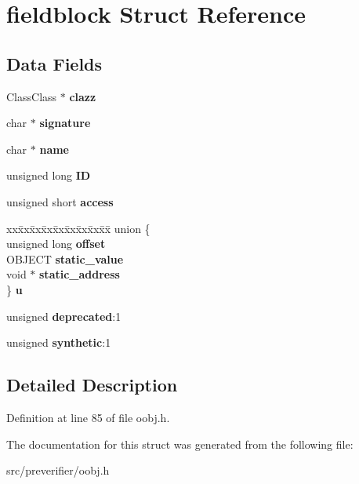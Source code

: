 \section{fieldblock Struct Reference}
\label{structfieldblock}
\subsection*{Data Fields}
\begin{DoxyCompactItemize}
\item 
ClassClass $\ast$ {\bfseries clazz}\label{structfieldblock_a1c9b6020cc197847c281e94df07b95b5}

\item 
char $\ast$ {\bfseries signature}\label{structfieldblock_a56524c11d5419653568ecfe54da096c4}

\item 
char $\ast$ {\bfseries name}\label{structfieldblock_a1116b87afcd1f49d7b7492f71d623825}

\item 
unsigned long {\bfseries ID}\label{structfieldblock_a4592680e5676103947a5ccf3e38e2795}

\item 
unsigned short {\bfseries access}\label{structfieldblock_ab323620b29b78b88e29f4f784c679759}

\item 
\begin{tabbing}
xx\=xx\=xx\=xx\=xx\=xx\=xx\=xx\=xx\=\kill
union \{\\
\>unsigned long {\bfseries offset}\\
\>OBJECT {\bfseries static\_value}\\
\>void $\ast$ {\bfseries static\_address}\\
\} {\bfseries u}\label{structfieldblock_a887c3c98b3d72aa1d1146594993cac80}
\\

\end{tabbing}\item 
unsigned {\bfseries deprecated}:1\label{structfieldblock_a88f142bb5f98bfa9a1880ab82d0b4b81}

\item 
unsigned {\bfseries synthetic}:1\label{structfieldblock_aa42eb871bf6ee0a948f70e028c2ef563}

\end{DoxyCompactItemize}


\subsection{Detailed Description}


Definition at line 85 of file oobj.h.



The documentation for this struct was generated from the following file:\begin{DoxyCompactItemize}
\item 
src/preverifier/oobj.h\end{DoxyCompactItemize}
